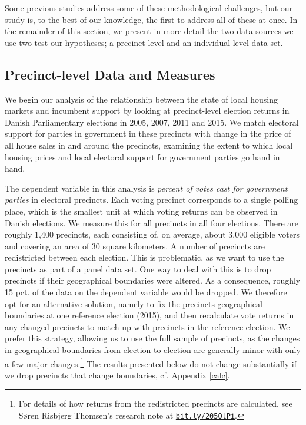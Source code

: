 \documentclass[12pt,a4paper]{article}
\begin{document}
	Some previous studies address some of these methodological challenges, but our study is, to the best of our knowledge, the first to address all of these at once. In the remainder of this section, we present in more detail the two data sources we use two test our hypotheses; a precinct-level and an individual-level data set.
	
	\subsection{Precinct-level Data and Measures}\label{precinctlevel}
	We begin our analysis of the relationship between the state of local housing markets and incumbent support by looking at precinct-level election returns in Danish Parliamentary elections in 2005, 2007, 2011 and 2015. We match electoral support for parties in government in these precincts with change in the price of all house sales in and around the precincts, examining the extent to which local housing prices and local electoral support for government parties go hand in hand.
	
	The dependent variable in this analysis is \textit{percent of votes cast for government parties} in electoral precincts. Each voting precinct corresponds to a single polling place, which is the smallest unit at which voting returns can be observed in Danish elections. We measure this for all precincts in all four elections. There are roughly 1,400 precincts, each consisting of, on average, about 3,000 eligible voters and covering an area of 30 square kilometers. A number of precincts are redistricted between each election. This is problematic, as we want to use the precincts as part of a panel data set. One way to deal with this is to drop precincts if their geographical boundaries were altered. As a consequence, roughly 15 pct. of the data on the dependent variable would be dropped. We therefore opt for an alternative solution, namely to fix the precincts geographical boundaries at one reference election (2015), and then recalculate vote returns in any changed precincts to match up with precincts in the reference election. We prefer this strategy, allowing us to use the full sample of precincts, as the changes in geographical boundaries from election to election are generally minor with only a few major changes.\footnote{For details of how returns from the redistricted precincts are calculated, see Søren Risbjerg Thomsen's research note at \texttt{\href{http://bit.ly/205OlPi}{bit.ly/205OlPi}}.} The results presented below do not change substantially if we drop precincts that change boundaries, cf. Appendix \ref{calc}.
	
\end{document}
